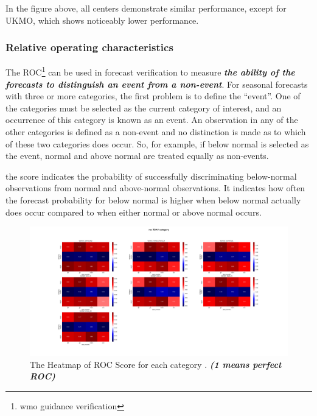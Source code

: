 In the figure above, all centers demonstrate similar performance, except for UKMO, which shows noticeably lower performance.




\subsubsection{Relative operating characteristics}
The ROC\footnote{wmo guidance verification} can be used in forecast verification to measure \textbf{\textit{the ability of the forecasts to distinguish an event from a non-event}}. For seasonal forecasts with three or more categories, the first
problem is to define the “event”. One of the categories must be selected as the current category
of interest, and an occurrence of this category is known as an event. An observation in any of
the other categories is defined as a non-event and no distinction is made as to which of these
two categories does occur. So, for example, if below normal is selected as the event, normal
and above normal are treated equally as non-events.

the score indicates the probability of successfully
discriminating below-normal observations from normal and above-normal observations. It
indicates how often the forecast probability for below normal is higher when below normal
actually does occur compared to when either normal or above normal occurs.


\begin{figure}[H]
    \centering
    \includegraphics[scale=0.25]{roc_T2M_category.png}
    \caption{The Heatmap of ROC Score for each category  . \textbf{\textit{(1 means perfect ROC)}}}
\end{figure}

